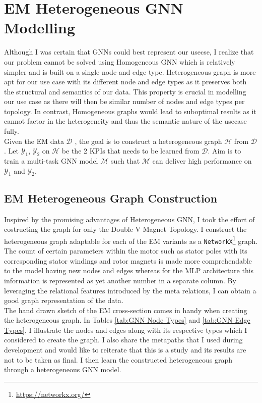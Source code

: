 \documentclass{report} %
\begin{document}
\section{EM Heterogeneous GNN Modelling}\label{sec:EM Heterogeneous GNN Model}
Although I was certain that \ac{GNN}s could best represent our usecse, I realize that our problem cannot be solved using Homogeneous \ac{GNN} which is relatively 
simpler and is built on a single node and edge type.
Heterogeneous graph is more apt for our use case with its different node and edge types as it preserves both the structural and semantics of our data. 
This property is crucial in modelling our use case as there will then be similar number of nodes and edge types per topology. 
In contrast, Homogeneous graphs would lead to suboptimal results as it cannot factor in the heterogeneity and thus the semantic nature of the usecase fully. \\

Given the \ac{EM} data $\mathcal{D}$ , the goal is to construct a heterogeneous graph $\mathcal{H}$ from $\mathcal{D}$. Let $\mathcal{Y}_1$, $\mathcal{Y}_2$ on 
$\mathcal{H}$ be the 2 \ac{KPI}s that needs to be learned from $\mathcal{D}$. Aim is to train a multi-task \ac{GNN} model $\mathcal{M}$ such that $\mathcal{M}$ can deliver 
high performance on $\mathcal{Y}_1$ and $\mathcal{Y}_2$.

\subsection{EM Heterogeneous Graph Construction}\label{subsec:EM Heterogeneous Graph Construction}
Inspired by the promising advantages of Heterogeneous \ac{GNN}, I took the effort of costructing the graph for only the Double V Magnet Topology.
I construct the heterogeneous graph adaptable for each of the \ac{EM} variants as a \texttt{NetworkX}\footnote{\url{https://networkx.org/}} graph.\\
The count of certain parameters within the motor such as stator poles with its corresponding stator windings and rotor magnets is made more comprehendable to the 
model having new nodes and edges whereas for the \ac{MLP} architecture this information is represented as yet another number in a separate column. 
By leveraging the relational features introduced by the meta relations, I can obtain a good graph representation of the data.\\
The hand drawn sketch of the \ac{EM} cross-section comes in handy when creating the heterogeneous graph. In Tables \ref{tab:GNN Node Types} and \ref{tab:GNN Edge Types}, 
I illustrate the nodes and edges along with its respective types which I considered to create the graph. I also share the metapaths that I used during development and 
would like to reiterate that this is a study and its results are not to be taken as final.
I then learn the constructed heterogeneous graph through a heterogeneous \ac{GNN} model.  \\
\end{document}
